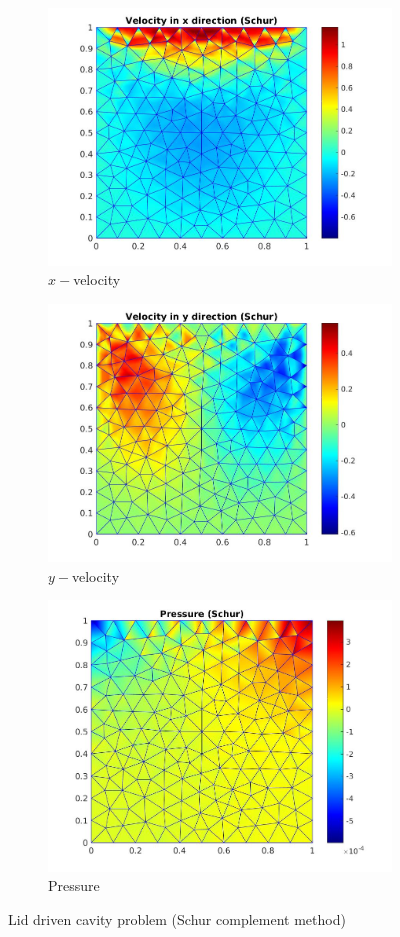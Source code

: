 \documentclass[a4paper,twoside,openright]{book}
\begin{document}
\begin{figure}
\begin{subfigure}{\textwidth}	
  \includegraphics[width=0.8\linewidth]{lid_schur_vx.jpg}
  \caption{$x-$velocity} 
  \label{x_vel_stoke_schur_lid}
\end{subfigure}
\begin{subfigure}{\textwidth}	
  \includegraphics[width=0.8\linewidth]{lid_schur_vy.jpg}
    \caption{$y-$velocity} 
    \label{y_vel_stoke_schur_lid}
\end{subfigure}
\begin{subfigure}{\textwidth}	
  \includegraphics[width=0.8\linewidth]{lid_schur_pressure.jpg}
    \caption{Pressure} 
    \label{pressure_stoke_schur_lid}
\end{subfigure}
\caption{Lid driven cavity problem (Schur complement method)}
\label{stoke_schur_lid}
\end{figure}
\end{document}

